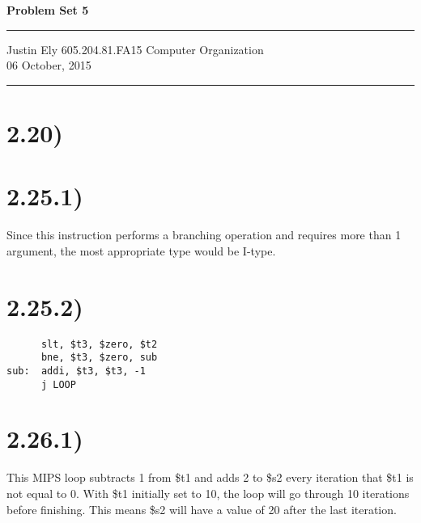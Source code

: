 \documentclass[a4paper,11pt]{article}
\begin{document}
\begin{flushright}

\vspace{1.1cm}

{\bf\Huge Problem Set 5}

\rule{0.25\linewidth}{0.5pt}

\vspace{0.5cm}
Justin Ely
\linebreak
\newline
\footnotesize{605.204.81.FA15 Computer Organization\\}
\vspace{0.5cm}
06 October, 2015
\end{flushright}

\noindent\rule{\linewidth}{1.0pt}



\section*{2.20)}


\section*{2.25.1)}

Since this instruction performs a branching operation and requires more than 1 argument, the most appropriate type
would be I-type.

\section*{2.25.2)}
\begin{verbatim}
      slt, $t3, $zero, $t2
      bne, $t3, $zero, sub
sub:  addi, $t3, $t3, -1
      j LOOP
\end{verbatim}


\section*{2.26.1)}
This MIPS loop subtracts 1 from \$t1 and adds 2 to \$s2 every iteration that \$t1 is not equal to 0.  With \$t1 initially set to
10, the loop will go through 10 iterations before finishing.  This means \$s2 will have a value of 20 after the last iteration.
\end{document}
